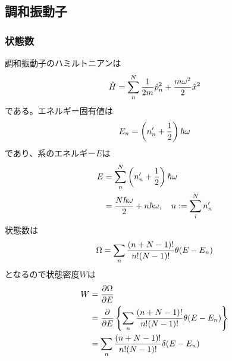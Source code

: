 \documentclass{jsarticle}  %
\numberwithin{equation}{section} %
\numberwithin{figure}{section}
\begin{document}
\subsection{調和振動子}
\subsubsection{状態数}
    調和振動子のハミルトニアンは
    \begin{align}
        \hat{H} = \sum_n^N \frac{1}{2m} \hat{p}_n^2 + \frac{m\omega^2}{2} \hat{x}^2 \notag
    \end{align}
    である。エネルギー固有値は
    \begin{align}
        E_n = \left( n_n' + \frac{1}{2} \right)\hbar \omega \notag
    \end{align}
    であり、系のエネルギー$E$は
    \begin{align}
        E &= \sum_n^N \left( n_n' + \frac{1}{2} \right)\hbar \omega \notag \\
        &= \frac{N \hbar \omega }{2} + n\hbar \omega ,\quad n:= \sum_i^N n_n'
    \end{align}
    状態数は
    \begin{align}
        \Omega = \sum_n \frac{(n+N-1)!}{n!(N-1)!} \theta(E-E_n) \notag 
    \end{align}
    となるので状態密度$W$は
    \begin{align}
        W &= \frac{\partial \Omega}{\partial E} \notag \\
        &= \frac{\partial }{\partial E} \left\{ \sum_n \frac{(n+N-1)!}{n!(N-1)!} \theta(E-E_n)  \right\} \notag \\
        &= \sum_n \frac{(n+N-1)!}{n!(N-1)!} \delta(E-E_n) \notag
    \end{align}
\end{document}
